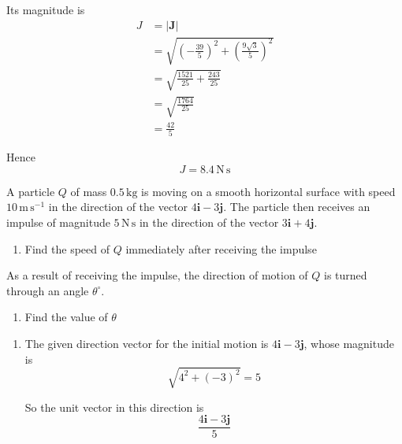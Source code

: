 \documentclass[leqno]{article}
\begin{document}
\begin{enumerate}[
  label=\textbf{\arabic*.},
  leftmargin=*,
  topsep=0pt,
  partopsep=0pt,
  parsep=0pt
]
\begin{djsSolution}
Its magnitude is
\begin{align*}
J&=\left|\mathbf{J}\right|\\
&=\sqrt{\left(-\frac{39}{5}\right)^2+\left(\frac{9\sqrt3}{5}\right)^2}\\
&=\sqrt{\frac{1521}{25}+\frac{243}{25}}\\
&=\sqrt{\frac{1764}{25}}\\
&=\frac{42}{5}
\end{align*}

Hence
\[
J=8.4\,\mathrm{N\,s}
\]

\end{djsSolution}


\newpage

\questionitem

A particle $Q$ of mass $0.5\,\mathrm{kg}$ is moving on a smooth horizontal surface with speed $10\,\mathrm{m\,s^{-1}}$ in the direction of the vector $4\mathbf{i}-3\mathbf{j}$. The particle then receives an impulse of magnitude $5\,\mathrm{N\,s}$ in the direction of the vector $3\mathbf{i}+4\mathbf{j}$. \\

\begin{enumerate}[label=\textbf{(\alph*)}]
  \item Find the speed of $Q$ immediately after receiving the impulse  \\
\end{enumerate}
As a result of receiving the impulse, the direction of motion of $Q$ is turned through an angle $\theta^\circ$. \\
\begin{enumerate}[label=\textbf{(\alph*)}, resume]
  \item Find the value of $\theta$  \\
\end{enumerate}

\vspace*{10pt}

\begin{djsSolution}
\begin{enumerate}[label=\textbf{(\alph*)}]
  \item The given direction vector for the initial motion is $4\mathbf{i}-3\mathbf{j}$, whose magnitude is
\[
\sqrt{4^2+(-3)^2}=5
\]

So the unit vector in this direction is
\[
\frac{4\mathbf{i}-3\mathbf{j}}{5}
\]


\end{enumerate}
\end{djsSolution}
\end{enumerate}
\end{document}
